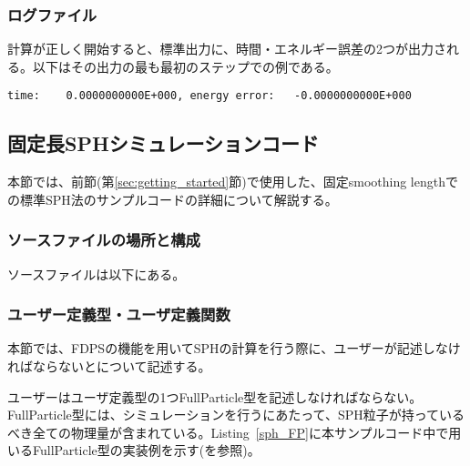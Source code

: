 \subsubsection{ログファイル}
計算が正しく開始すると、標準出力に、時間・エネルギー誤差の2つが出力される。以下はその出力の最も最初のステップでの例である。
\begin{lstlisting}[caption=標準出力の例]
time:    0.0000000000E+000, energy error:   -0.0000000000E+000
\end{lstlisting}

\subsection{固定長SPHシミュレーションコード}
\label{subsec:how_to_use:sph}
本節では、前節(第\ref{sec:getting_started}節)で使用した、固定smoothing lengthでの標準SPH法のサンプルコードの詳細について解説する。

\subsubsection{ソースファイルの場所と構成}
ソースファイルは\dirNameSPHSample 以下にある。

\subsubsection{ユーザー定義型・ユーザ定義関数}
本節では、FDPSの機能を用いてSPHの計算を行う際に、ユーザーが記述しなければならない\structure と\procedure について記述する。

ユーザーはユーザ定義型の1つFullParticle型を記述しなければならない。FullParticle型には、シミュレーションを行うにあたって、SPH粒子が持っているべき全ての物理量が含まれている。Listing~\ref{sph_FP}に本サンプルコード中で用いるFullParticle型の実装例を示す(を参照)。

